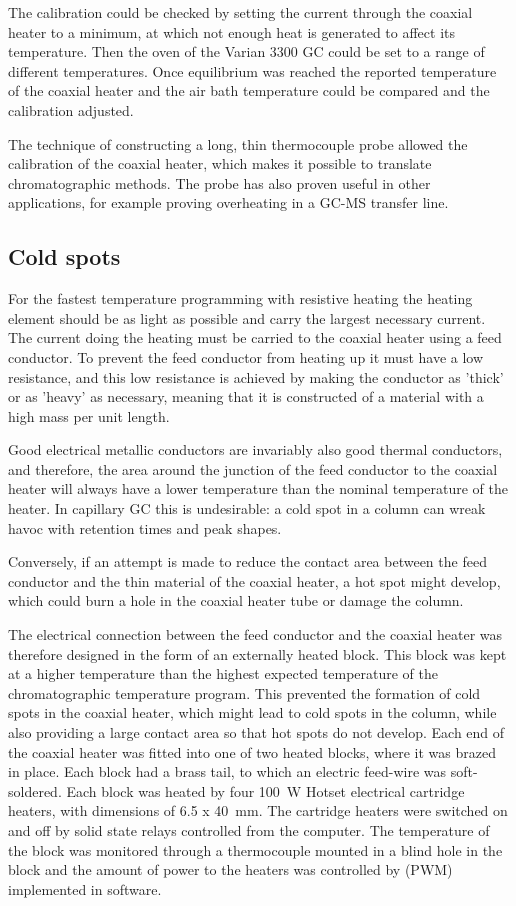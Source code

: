 The calibration could be checked by setting the current through the coaxial
heater to a minimum, at which not enough heat is generated to affect its
temperature. Then the oven of the Varian 3300 GC could be set to a range of
different temperatures. Once equilibrium was reached the reported temperature of
the coaxial heater and the air bath temperature could be compared and the
calibration adjusted.

The technique of constructing a long, thin thermocouple probe allowed the
calibration of the coaxial heater, which makes it possible to translate
chromatographic methods. The probe has also proven useful in other applications,
for example proving overheating in a GC-MS transfer line.

\subsection{Cold spots}
\label{sec:ColdSpots}

For the fastest temperature programming with resistive heating the heating
element should be as light as possible and carry the largest necessary current.
The current doing the heating must be carried to the coaxial heater using a feed
conductor. To prevent the feed conductor from heating up it must have a low
resistance, and this low resistance is achieved by making the conductor as
'thick' or as 'heavy' as necessary, meaning that it is constructed of a material
with a high mass per unit length.

Good electrical metallic conductors are invariably also good thermal conductors,
and therefore, the area around the junction of the feed conductor to the coaxial
heater will always have a lower temperature than the nominal temperature of the
heater. In capillary GC this is undesirable: a cold spot in a column can wreak
havoc with retention times and peak shapes.

Conversely, if an attempt is made to reduce the contact area between the feed
conductor and the thin material of the coaxial heater, a hot spot might develop,
which could burn a hole in the coaxial heater tube or damage the column.

The electrical connection between the feed conductor and the coaxial heater was
therefore designed in the form of an externally heated block. This block was
kept at a higher temperature than the highest expected temperature of the
chromatographic temperature program. This prevented the formation of cold spots
in the coaxial heater, which might lead to cold spots in the column, while also
providing a large contact area so that hot spots do not develop. Each end of the
coaxial heater was fitted into one of two heated blocks, where it was brazed in
place. Each block had a brass tail, to which an electric feed-wire was
soft-soldered. Each block was heated by four \SI{100}{\watt}
Hotset\texttrademark{} electrical cartridge heaters, with dimensions of \SI{6.5
x 40}{\milli\metre}. The cartridge heaters were switched on and off by solid
state relays controlled from the computer. The temperature of the block was
monitored through a thermocouple mounted in a blind hole in the block and the
amount of power to the heaters was controlled by  (PWM) implemented in software.
 
